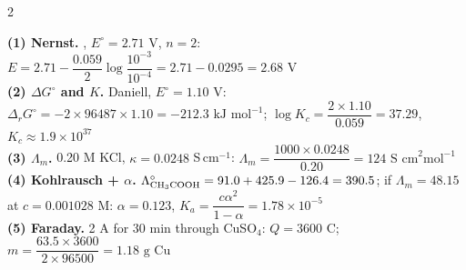 \documentclass[9pt,a4paper]{extarticle}
\begin{document}
\begin{multicols}{2}
\begin{numbox}
\textbf{(1) Nernst.} , $E^\circ=2.71$ V, $n=2$:\\
$E=2.71-\dfrac{0.059}{2}\log\dfrac{10^{-3}}{10^{-4}}=2.71-0.0295=\boxed{2.68\text{ V}}$\\[1pt]
\textbf{(2) $\Delta G^\circ$ and $K$.} Daniell, $E^\circ=1.10$ V: $\Delta_rG^\circ=-2\times96487\times1.10=\boxed{-212.3\text{ kJ mol}^{-1}}$; $\log K_c=\dfrac{2\times1.10}{0.059}=37.29$, $K_c\approx\boxed{1.9\times10^{37}}$\\[1pt]
\textbf{(3) $\Lambda_m$.} 0.20 M KCl, $\kappa=0.0248$ S\,cm$^{-1}$: $\Lambda_m=\dfrac{1000\times0.0248}{0.20}=\boxed{124\text{ S cm}^2\text{mol}^{-1}}$\\[1pt]
\textbf{(4) Kohlrausch + $\alpha$.} $\Lambda^\circ_{\ce{CH3COOH}}=91.0+425.9-126.4=390.5$; if $\Lambda_m=48.15$ at $c=0.001028$ M: $\alpha=0.123$, $K_a=\dfrac{c\alpha^2}{1-\alpha}=\boxed{1.78\times10^{-5}}$\\[1pt]
\textbf{(5) Faraday.} 2 A for 30 min through CuSO$_4$: $Q=3600$ C; $m=\dfrac{63.5\times3600}{2\times96500}=\boxed{1.18\text{ g Cu}}$
\end{numbox}


\end{multicols}
\end{document}
